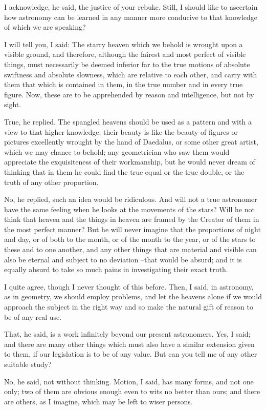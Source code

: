 I acknowledge, he said, the justice of your rebuke. Still, I should like to ascertain how astronomy can be learned in any manner more conducive to that knowledge of which we are speaking?

I will tell you, I said: The starry heaven which we behold is wrought upon a visible ground, and therefore, although the fairest and most perfect of visible things, must necessarily be deemed inferior far to the true motions of absolute swiftness and absolute slowness, which are relative to each other, and carry with them that which is contained in them, in the true number and in every true figure. Now, these are to be apprehended by reason and intelligence, but not by sight.

True, he replied.
The spangled heavens should be used as a pattern and with a view to that higher knowledge; their beauty is like the beauty of figures or pictures excellently wrought by the hand of Daedalus, or some other great artist, which we may chance to behold; any geometrician who saw them would appreciate the exquisiteness of their workmanship, but he would never dream of thinking that in them he could find the true equal or the true double, or the truth of any other proportion.

No, he replied, such an idea would be ridiculous.
And will not a true astronomer have the same feeling when he looks at the movements of the stars? Will he not think that heaven and the things in heaven are framed by the Creator of them in the most perfect manner? But he will never imagine that the proportions of night and day, or of both to the month, or of the month to the year, or of the stars to these and to one another, and any other things that are material and visible can also be eternal and subject to no deviation --that would be absurd; and it is equally absurd to take so much pains in investigating their exact truth.

I quite agree, though I never thought of this before.
Then, I said, in astronomy, as in geometry, we should employ problems, and let the heavens alone if we would approach the subject in the right way and so make the natural gift of reason to be of any real use.

That, he said, is a work infinitely beyond our present astronomers.
Yes, I said; and there are many other things which must also have a similar extension given to them, if our legislation is to be of any value. But can you tell me of any other suitable study?

No, he said, not without thinking.
Motion, I said, has many forms, and not one only; two of them are obvious enough even to wits no better than ours; and there are others, as I imagine, which may be left to wiser persons.

